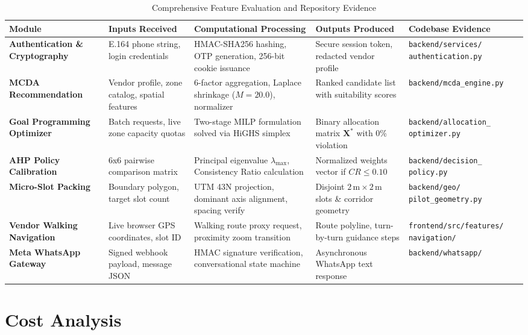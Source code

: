 \begin{table}[htbp]
\caption{Comprehensive Feature Evaluation and Repository Evidence}
\label{tab:feature_evaluation_matrix}
\centering
\scriptsize
\begin{tabularx}{\textwidth}{p{}p{}p{}p{}p{}}
\toprule
\textbf{Module} & \textbf{Inputs Received} & \textbf{Computational Processing} & \textbf{Outputs Produced} & \textbf{Codebase Evidence} \\
\midrule
\textbf{Authentication \& Cryptography} & E.164 phone string, login credentials & HMAC-SHA256 hashing, OTP generation, 256-bit cookie issuance & Secure session token, redacted vendor profile & \texttt{backend/services/ authentication.py} \\
\textbf{MCDA Recommendation} & Vendor profile, zone catalog, spatial features & 6-factor aggregation, Laplace shrinkage ($M=20.0$), normalizer & Ranked candidate list with suitability scores & \texttt{backend/mcda\_engine.py} \\
\textbf{Goal Programming Optimizer} & Batch requests, live zone capacity quotas & Two-stage MILP formulation solved via HiGHS simplex & Binary allocation matrix $\mathbf{X}^*$ with 0\% violation & \texttt{backend/allocation\_ optimizer.py} \\
\textbf{AHP Policy Calibration} & 6x6 pairwise comparison matrix & Principal eigenvalue $\lambda_{\max}$, Consistency Ratio calculation & Normalized weights vector if $CR \le 0.10$ & \texttt{backend/decision\_ policy.py} \\
\textbf{Micro-Slot Packing} & Boundary polygon, target slot count & UTM 43N projection, dominant axis alignment, spacing verify & Disjoint $2\,\text{m}\times 2\,\text{m}$ slots \& corridor geometry & \texttt{backend/geo/ pilot\_geometry.py} \\
\textbf{Vendor Walking Navigation} & Live browser GPS coordinates, slot ID & Walking route proxy request, proximity zoom transition & Route polyline, turn-by-turn guidance steps & \texttt{frontend/src/features/ navigation/} \\
\textbf{Meta WhatsApp Gateway} & Signed webhook payload, message JSON & HMAC signature verification, conversational state machine & Asynchronous WhatsApp text response & \texttt{backend/whatsapp/} \\
\bottomrule
\end{tabularx}
\end{table}

\section{Cost Analysis}
\label{sec:cost_analysis}

